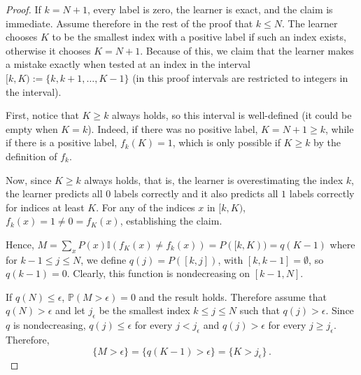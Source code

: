 \documentclass[11pt,twoside]{article}
\newcommand{\I}{\mathbb I}
\renewcommand{\P}{\mathbb P}
\theoremstyle{definition}
\theoremstyle{remark}
\begin{document}
\begin{proof}
If $k=N+1$, every label is zero, the learner is exact, and the claim is
immediate. Assume therefore in the rest of the proof that $k\le N$.
The learner chooses $K$ to be the smallest index with a positive label if such an index
exists, otherwise it chooses $K=N+1$.
Because of this, we claim that the learner
makes a mistake exactly when tested at an index in the interval $[k,K) := \{k,k+1,\dots,K-1\}$ (in this proof
intervals are restricted to integers in the interval).

First, notice that $K\ge k$ always holds, so this interval is well-defined (it could be empty when $K=k$).
Indeed, if there was no positive label, $K=N+1\ge k$, while if there is a positive label,
$f_k(K)=1$, which is only possible if $K\ge k$ by the definition of $f_k$.

Now, since $K\ge k$ always holds, that is, the learner is overestimating the index $k$,
the learner predicts all $0$ labels correctly and it also predicts all $1$ labels correctly
for indices at least $K$. For any of the indices $x$ in $[k,K)$, $f_k(x)=1\ne 0=f_K(x)$,
establishing the claim.

Hence, $M = \sum_x P(x) \I( f_K(x)\ne f_k(x)) = P( [k,K) ) = q(K-1)$
where for $k-1\le j \le N$, we define $q(j) = P([k,j])$, with
$[k,k-1]=\emptyset$, so $q(k-1)=0$.
Clearly, this function is nondecreasing on $[k-1,N]$.

If $q(N)\le \epsilon$, $\P(M>\epsilon)=0$ and the result holds. Therefore assume
that $q(N)>\epsilon$ and let $j_\epsilon$ be the smallest index $k\le j \le N$ such that $q(j)>\epsilon$.
Since $q$ is nondecreasing, $q(j)\le \epsilon$ for every $j<j_\epsilon$ and
$q(j)> \epsilon$ for every $j\ge j_\epsilon$.
Therefore,
\[
\{M>\epsilon\} = \{q(K-1)>\epsilon\} = \{K>j_\epsilon\}\,.
\]


\end{proof}
\end{document}
